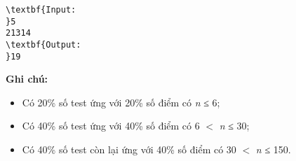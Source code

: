\begin{verbatim}
\textbf{Input:
}5
21314
\textbf{Output:
}19 
\end{verbatim}

\textbf{\textbf{Ghi chú:}}
\begin{itemize}
	\item Có 20\% số test ứng với 20\% số điểm có \emph{n }≤ 6;
	\item Có 40\% số test ứng với 40\% số điểm có 6 $<$ \emph{n} ≤ 30;
	\item Có 40\% số test còn lại ứng với 40\% số điểm có 30 $<$ \emph{n} ≤ 150.
\end{itemize}